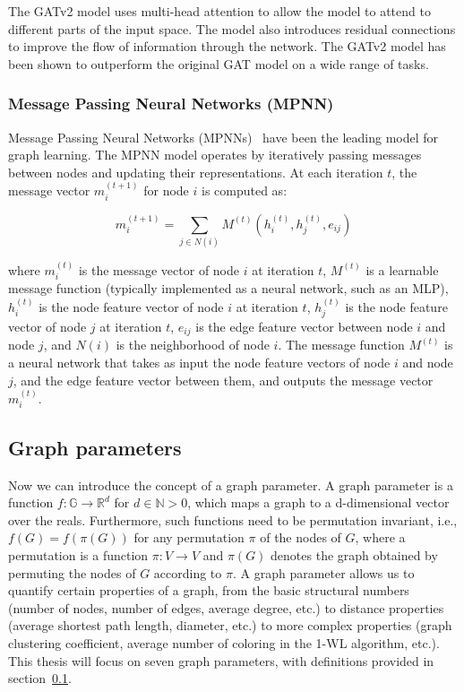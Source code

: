 \documentclass{article}
\begin{document}
The GATv2 model uses multi-head attention to allow the model to attend to different parts of the input space. The model also introduces residual connections to improve the flow of information through the network. The GATv2 model has been shown to outperform the original GAT model on a wide range of tasks.

\subsubsection{Message Passing Neural Networks (MPNN)}
Message Passing Neural Networks (MPNNs)~\cite{gilmer2017neural} have been the leading model for graph learning. The MPNN model operates by iteratively passing messages between nodes and updating their representations. At each iteration $t$, the message vector $m_i^{(t+1)}$ for node $i$ is computed as:

$$
    m_i^{(t+1)} = \sum_{j\in N(i)}M^{(t)}(h_i^{(t)}, h_j^{(t)}, e_{ij})
$$

where $m_i^{(t)}$ is the message vector of node $i$ at iteration $t$, $M^{(t)}$ is a learnable message function (typically implemented as a neural network, such as an MLP), $h_i^{(t)}$ is the node feature vector of node $i$ at iteration $t$, $h_j^{(t)}$ is the node feature vector of node $j$ at iteration $t$, $e_{ij}$ is the edge feature vector between node $i$ and node $j$, and $N(i)$ is the neighborhood of node $i$. The message function $M^{(t)}$ is a neural network that takes as input the node feature vectors of node $i$ and node $j$, and the edge feature vector between them, and outputs the message vector $m_i^{(t)}$.

\subsection{Graph parameters} \label{sec:graph_parameters}
Now we can introduce the concept of a graph parameter. A graph parameter is a function $f: \mathbb{G} \rightarrow \mathbb{R}^d$ for $d\in \mathbb{N} >0$, which maps a graph to a d-dimensional vector over the reals. Furthermore, such functions need to be permutation invariant, i.e., $f(G) = f(\pi(G))$ for any permutation $\pi$ of the nodes of $G$, where a permutation is a function $\pi: V \rightarrow V$ and $\pi(G)$ denotes the graph obtained by permuting the nodes of $G$ according to $\pi$. A graph parameter allows us to quantify certain properties of a graph, from the basic structural numbers (number of nodes, number of edges, average degree, etc.) to distance properties (average shortest path length, diameter, etc.) to more complex properties (graph clustering coefficient, average number of coloring in the 1-WL algorithm, etc.). This thesis will focus on seven graph parameters, with definitions provided in section~\ref{sec:graph_parameters}.
\end{document}
